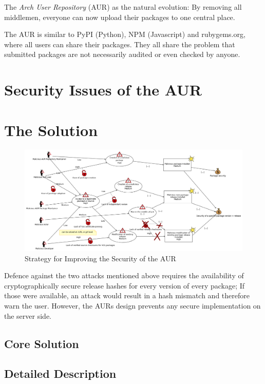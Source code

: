 \documentclass{scrartcl}
\begin{document}
  The \emph{Arch User Repository} (AUR) as the natural evolution: By removing all middlemen, everyone can now upload their packages to one central place. \cite{wiki:AUR}

  The AUR is similar to PyPI (Python), NPM (Javascript) and rubygems.org, where all users can share their packages. They all share the problem that submitted packages are not necessarily audited or even checked by anyone.

  \section{Security Issues of the AUR} %

  \section{The Solution} %
    \begin{figure}
      \includegraphics[width=\textwidth,trim={0 0 245 0},clip]{img/threat2.png}
      \caption[Threat Prevention Strategy]{Strategy for Improving the Security of the AUR}
      \label{fig:threat2}
    \end{figure}

    Defence against the two attacks mentioned above requires the availability of cryptographically secure release hashes for every version of every package; If those were available, an attack would result in a hash mismatch and therefore warn the user. However, the AURs design prevents any secure implementation on the server side.

    \subsection{Core Solution}  %
    \subsection{Detailed Description} %
\end{document}
